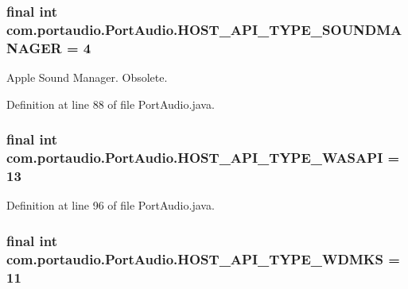 \subsubsection[{\texorpdfstring{H\+O\+S\+T\+\_\+\+A\+P\+I\+\_\+\+T\+Y\+P\+E\+\_\+\+S\+O\+U\+N\+D\+M\+A\+N\+A\+G\+ER}{HOST_API_TYPE_SOUNDMANAGER}}]{\setlength{\rightskip}{0pt plus 5cm}final {\bf int} com.\+portaudio.\+Port\+Audio.\+H\+O\+S\+T\+\_\+\+A\+P\+I\+\_\+\+T\+Y\+P\+E\+\_\+\+S\+O\+U\+N\+D\+M\+A\+N\+A\+G\+ER = 4\hspace{0.3cm}{\ttfamily [static]}}\hypertarget{classcom_1_1portaudio_1_1_port_audio_a3e994d6f1b8393c1fadf330fc18b5649}{}\label{classcom_1_1portaudio_1_1_port_audio_a3e994d6f1b8393c1fadf330fc18b5649}
Apple Sound Manager. Obsolete. 

Definition at line 88 of file Port\+Audio.\+java.

\subsubsection[{\texorpdfstring{H\+O\+S\+T\+\_\+\+A\+P\+I\+\_\+\+T\+Y\+P\+E\+\_\+\+W\+A\+S\+A\+PI}{HOST_API_TYPE_WASAPI}}]{\setlength{\rightskip}{0pt plus 5cm}final {\bf int} com.\+portaudio.\+Port\+Audio.\+H\+O\+S\+T\+\_\+\+A\+P\+I\+\_\+\+T\+Y\+P\+E\+\_\+\+W\+A\+S\+A\+PI = 13\hspace{0.3cm}{\ttfamily [static]}}\hypertarget{classcom_1_1portaudio_1_1_port_audio_a878906a801ec0974c8379defcbb1a45f}{}\label{classcom_1_1portaudio_1_1_port_audio_a878906a801ec0974c8379defcbb1a45f}


Definition at line 96 of file Port\+Audio.\+java.

\subsubsection[{\texorpdfstring{H\+O\+S\+T\+\_\+\+A\+P\+I\+\_\+\+T\+Y\+P\+E\+\_\+\+W\+D\+M\+KS}{HOST_API_TYPE_WDMKS}}]{\setlength{\rightskip}{0pt plus 5cm}final {\bf int} com.\+portaudio.\+Port\+Audio.\+H\+O\+S\+T\+\_\+\+A\+P\+I\+\_\+\+T\+Y\+P\+E\+\_\+\+W\+D\+M\+KS = 11\hspace{0.3cm}{\ttfamily [static]}}\hypertarget{classcom_1_1portaudio_1_1_port_audio_a61826bf26d326ff98510f1274f6f3f5b}{}\label{classcom_1_1portaudio_1_1_port_audio_a61826bf26d326ff98510f1274f6f3f5b}


